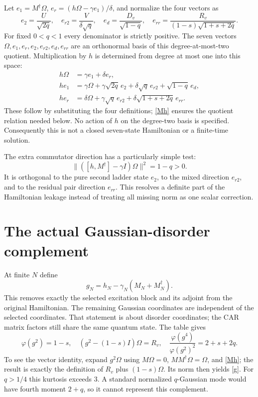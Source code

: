 \documentclass[11pt]{article}
\newcommand{\ph}{\varphi}
\begin{document}
\newpage
Let $e_1=M^\dagger\Omega$, $e_r=(h\Omega-\gamma e_1)/\delta$,
and normalize the four vectors as
\begin{equation}
 e_2=\frac U{\sqrt{2q}},\quad
 e_{r2}=\frac V{\delta\sqrt q},\quad
 e_d=\frac{D_v}{\sqrt{1-q}},\quad
 e_{rr}=\frac{R_v}{(1-s)\sqrt{1+s+2q}}.
\end{equation}
For fixed $0<q<1$ every denominator is strictly positive.
The seven vectors $\Omega,e_1,e_r,e_2,e_{r2},e_d,e_{rr}$ are an
orthonormal basis of this degree-at-most-two quotient. Multiplication
by $h$ is determined from degree at most one into this space:
\begin{align}\label{actions}
 h\Omega&=\gamma e_1+\delta e_r,\\
 he_1&=\gamma\Omega+\gamma\sqrt{2q}\,e_2
       +\delta\sqrt q\,e_{r2}+\sqrt{1-q}\,e_d,\\
 he_r&=\delta\Omega+\gamma\sqrt q\,e_{r2}
       +\delta\sqrt{1+s+2q}\,e_{rr}.
\end{align}
These follow by substituting the four definitions; \eqref{Mh}
ensures the quotient relation needed below. No action of $h$ on
the degree-two basis is specified. Consequently this is not a
closed seven-state Hamiltonian or a finite-time solution.

The extra commutator direction has a particularly simple test:
\begin{equation}
 \|([h,M^\dagger]-\gamma I)\Omega\|^2=1-q>0.
\end{equation}
It is orthogonal to the pure second ladder state $e_2$, to the
mixed direction $e_{r2}$, and to the residual pair direction
$e_{rr}$. This resolves a definite part of the Hamiltonian leakage
instead of treating all missing norm as one scalar correction.

\section{The actual Gaussian-disorder complement}
At finite $N$ define
\begin{equation}
 g_N=h_N-\gamma_N(M_N+M_N^\dagger).
\end{equation}
This removes exactly the selected excitation block and its adjoint
from the original Hamiltonian. The remaining Gaussian coordinates
are independent of the selected coordinates. That statement is
about disorder coordinates; the CAR matrix factors still share
the same quantum state. The table gives
\begin{equation}\label{g}
 \ph(g^2)=1-s,\quad
 (g^2-(1-s)I)\Omega=R_v,\quad
 \frac{\ph(g^4)}{\ph(g^2)^2}=2+s+2q.
\end{equation}
To see the vector identity, expand $g^2\Omega$ using
$M\Omega=0$, $MM^\dagger\Omega=\Omega$, and \eqref{Mh}; the
result is exactly the definition of $R_v$ plus $(1-s)\Omega$.
Its norm then yields \eqref{g}. For $q>1/4$ this kurtosis exceeds
$3$. A standard normalized $q$-Gaussian mode would have fourth
moment $2+q$, so it cannot represent this complement.
\end{document}
